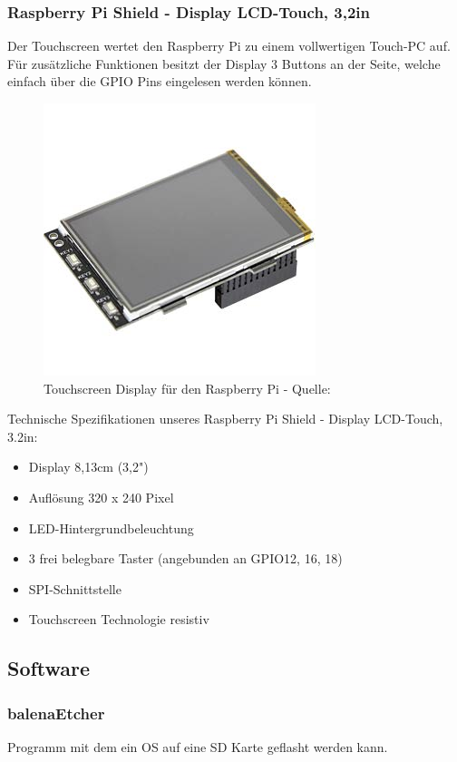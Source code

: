 \documentclass[a4paper,11pt,singlespacing]{article}
\begin{document}
			\subsubsection{Raspberry Pi Shield - Display LCD-Touch, 3,2in}
				Der Touchscreen wertet den Raspberry Pi zu einem vollwertigen Touch-PC auf. Für zusätzliche Funktionen besitzt der Display 3 Buttons an der Seite, welche einfach über die GPIO Pins eingelesen werden können.
				\begin{figure}[H]
					\centering
					\includegraphics[scale=0.5]{touch_display}
					\caption{Touchscreen Display für den Raspberry Pi - Quelle: \cite{Picture_touchdisplay}}
					\label{touchdisplay}
				\end{figure}
				Technische Spezifikationen unseres Raspberry Pi Shield - Display LCD-Touch, 3.2in:
				\begin{itemize}
					\item Display 8,13cm (3,2")
					\item Auflösung 320 x 240 Pixel
					\item LED-Hintergrundbeleuchtung
					\item 3 frei belegbare Taster (angebunden an GPIO12, 16, 18)
					\item SPI-Schnittstelle
					\item Touchscreen Technologie resistiv
				\end{itemize}
    			
    	\subsection{Software}
    		\subsubsection{balenaEtcher}
    			Programm mit dem ein OS auf eine SD Karte geflasht werden kann.
\end{document}
